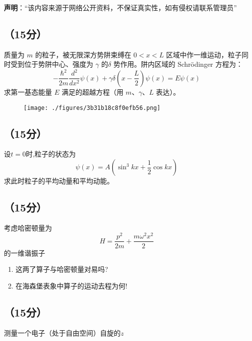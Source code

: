 
\textbf{声明}：“该内容来源于网络公开资料，不保证真实性，如有侵权请联系管理员”

\subsection{（15分）}
质量为 $m$ 的粒子，被无限深方势阱束缚在 $0 < x < L$ 区域中作一维运动，粒子同时受到位于势阱中心、强度为 $\gamma$ 的$\delta$ 势作用。阱内区域的 Schrödinger 方程为：
\[
-\frac{\hbar^2}{2m}\frac{d^2 }{dx^2}\psi(x) + \gamma \delta \left(x - \frac{L}{2}\right)\psi(x) = E \psi(x)~
\]
求第一基态能量 $E$ 满足的超越方程（用 $m$、$\gamma$、$L$ 表达）。
\begin{figure}[ht]
\centering
\texttt{[image: ./figures/3b31b18c8f0efb56.png]}
\caption{} \label{fig_SEU01_1}
\end{figure}

\subsection{（15分）}
设$t=0$时,粒子的状态为
 \[\psi(x) = A \left( \sin^3 kx + \frac{1}{2} \cos kx \right)~\]
求此时粒子的平均动量和平均动能。

\subsection{（15分）}
考虑哈密顿量为 
\[H = \frac{p^2}{2m} + \frac{m \omega^2 x^2}{2}~\]
的一维谐振子
\begin{enumerate}
    “初始位置”  和“初始动量” 的算子：
    \[
    x_0 = x \cos \omega t - \frac{p}{m \omega} \sin \omega t~
    \]
    \[
    p_0 = p \cos \omega t + m \omega x \sin \omega t~
    \]
    的期待值对时间的依赖关系。
    \item  这两了算子与哈密顿量对易吗?
    \item  在海森堡表象中算子的运动去程为何!
\end{enumerate}

\subsection{（15分）}测量一个电子（处于自由空间）自旋的$z$